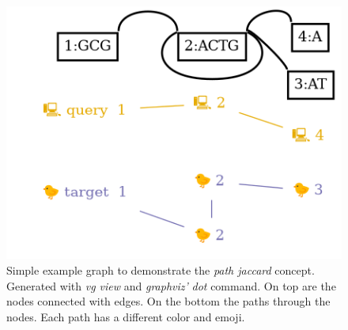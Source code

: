 \begin{figure}[ht!]
	\includegraphics[width=0.7\linewidth]{fig/jaccard/jaccard.png}
	\caption{Simple example graph to demonstrate the \textit{path jaccard} concept. Generated with \textit{vg view} and \textit{graphviz'} \textit{dot} command. On top are the nodes connected with edges. On the bottom the paths through the nodes. Each path has a different color and emoji.}
	\label{fig:jaccard}
\end{figure}
